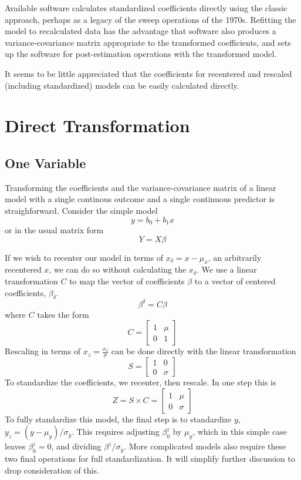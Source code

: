\documentclass[]{article}
\begin{document}
Available software calculates standardized coefficients directly using
the classic approach, perhaps as a legacy of the sweep operations of the
1970s. Refitting the model to recalculated data has the advantage that
software also produces a variance-covariance matrix appropriate to the
transformed coefficients, and sets up the software for post-estimation
operations with the transformed model.

It seems to be little appreciated that the coefficients for recentered
and rescaled (including standardized) models can be easily calculated
directly.

\section{Direct Transformation}\label{direct-transformation}

\subsection{One Variable}\label{one-variable}

Transforming the coefficients and the variance-covariance matrix of a
linear model with a single continous outcome and a single continuous
predictor is straighforward. Consider the simple model
\[y = b_0 + b_1x\] or in the usual matrix form \[Y=X\beta\]

If we wish to recenter our model in terms of \(x_\delta=x-\mu_x\), an
arbitrarily recentered \(x\), we can do so without calculating the
\(x_\delta\). We use a linear transformation \(C\) to map the vector of
coefficients \(\beta\) to a vector of centered coefficients,
\(\beta_\delta\). \[\beta^\delta=C\beta\] where \(C\) takes the form
\[C=\begin{bmatrix}1 & \mu \\ 0 & 1 \end{bmatrix}\] Rescaling in terms
of \(x_z=\frac{x_\delta}{\sigma}\) can be done directly with the linear
transformation \[S=\begin{bmatrix}1 & 0 \\ 0 & \sigma \end{bmatrix}\] To
standardize the coefficients, we recenter, then rescale. In one step
this is
\[Z = S \times C =\begin{bmatrix}1 & \mu \\ 0 & \sigma \end{bmatrix}\]
To fully standardize this model, the final step is to standardize \(y\),
\(y_z=(y-\mu_y)/\sigma_y\). This requires adjusting \(\beta_0^z\) by
\(\mu_y\), which in this simple case leaves \(\beta_0^z=0\), and
dividing \(\beta^z/\sigma_y\). More complicated models also require
these two final operations for full standardization. It will simplify
further discussion to drop consideration of this.
\end{document}
